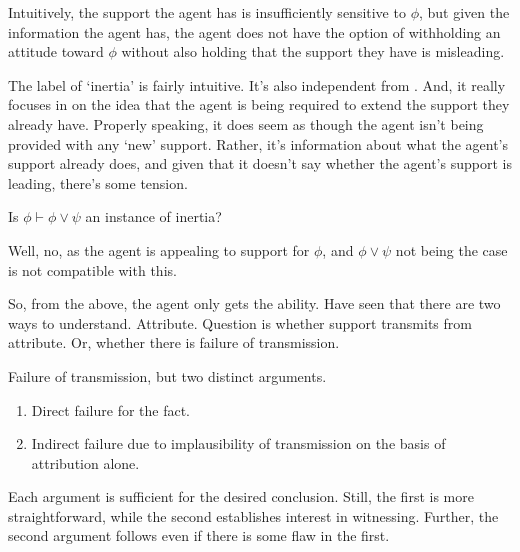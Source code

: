 \documentclass[10pt]{article}
\begin{document}
\begin{note}
  Intuitively, the support the agent has is insufficiently sensitive to \(\phi\), but given the information the agent has, the agent does not have the option of withholding an attitude toward \(\phi\) without also holding that the support they have is misleading.

  The label of `inertia' is fairly intuitive.
  It's also independent from \citeauthor{Wright:2016wl}.
  And, it really focuses in on the idea that the agent is being required to extend the support they already have.
  Properly speaking, it does seem as though the agent isn't being provided with any `new' support.
  Rather, it's information about what the agent's support already does, and given that it doesn't say whether the agent's support is leading, there's some tension.
\end{note}

\begin{note}
  Is \(\phi \vdash \phi \lor \psi\) an instance of inertia?

  Well, no, as the agent is appealing to support for \(\phi\), and \(\phi \lor \psi\) not being the case is not compatible with this.
\end{note}


\newpage

\begin{note}
  So, from the above, the agent only gets the ability.
  Have seen that there are two ways to understand.
  Attribute.
  Question is whether support transmits from attribute.
  Or, whether there is failure of transmission.

  Failure of transmission, but two distinct arguments.
  \begin{enumerate}
  \item Direct failure for the fact.
  \item Indirect failure due to implausibility of transmission on the basis of attribution alone.
  \end{enumerate}
  Each argument is sufficient for the desired conclusion.
  Still, the first is more straightforward, while the second establishes interest in witnessing.
  Further, the second argument follows even if there is some flaw in the first.
\end{note}
\end{document}
